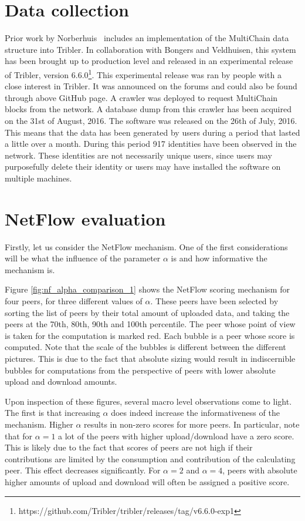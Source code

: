 \documentclass[a4paper,11pt]{book}
\theoremstyle{definition}
\begin{document}
\section{Data collection}

Prior work by Norberhuis~\cite{norberhuis2015multichain} includes
an implementation of the MultiChain data structure into Tribler. In collaboration with Bongers and Veldhuisen,
this system has been brought up to production level and released in an experimental release of Tribler,
version 6.6.0\footnote{https://github.com/Tribler/tribler/releases/tag/v6.6.0-exp1}. This experimental
release was ran by people with a close interest in Tribler. It was announced on the forums and could
also be found through above GitHub page. A crawler was deployed to request MultiChain blocks from 
the network. A database dump from this crawler has been acquired on the 31st of August, 2016. The software
was released on the 26th of July, 2016. This means that the data has been generated by users during a period
that lasted a little over a month. During this period 917 identities have been observed in the network.
These identities are not necessarily unique users, since users may purposefully 
delete their identity or users may have installed the software on multiple machines.

\section{NetFlow evaluation}

Firstly, let us consider the NetFlow mechanism. One of the first considerations will be what the influence
of the parameter $\alpha$ is and how informative the mechanism is.

Figure \ref{fig:nf_alpha_comparison_1} 
shows the NetFlow scoring mechanism for four peers, for three
different values of $\alpha$. 
These peers have been selected by sorting the list of peers by their total
amount of uploaded data, and taking the peers at the 70th, 80th, 90th and 100th percentile.
The peer whose point of view is taken for the computation is marked red. Each bubble is a peer whose
score is computed. Note that the scale of the bubbles is different between the different pictures. 
This is due to the fact that absolute sizing would result in indiscernible bubbles for computations
from the perspective of peers with lower absolute upload and download amounts. 

Upon inspection of these figures, several macro level observations come to light. The first
is that increasing $\alpha$ does indeed increase the informativeness of the mechanism.
Higher $\alpha$ results in non-zero scores for more peers. In particular, note that
for $\alpha=1$ a lot of the peers with higher upload/download have a zero score. This is
likely due to the fact that scores of peers are not high if their contributions are limited
by the consumption and contribution of the calculating peer. This effect decreases
significantly. For $\alpha=2$ and $\alpha=4$, peers with absolute higher amounts of upload
and download will often be assigned a positive score. 
\end{document}
